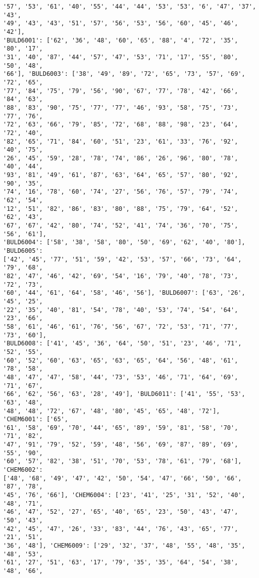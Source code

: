 \documentclass[11pt]{article}
\begin{document}
\begin{Verbatim}[commandchars=\\\{\}]
'57', '53', '61', '40', '55', '44', '44', '53', '53', '6', '47', '37', '43',
'49', '43', '43', '51', '57', '56', '53', '56', '60', '45', '46', '42'],
'BULD6001': ['62', '36', '48', '60', '65', '88', '4', '72', '35', '80', '17',
'31', '40', '87', '44', '57', '47', '53', '71', '17', '55', '80', '50', '48',
'66'], 'BULD6003': ['38', '49', '89', '72', '65', '73', '57', '69', '72', '65',
'77', '84', '75', '79', '56', '90', '67', '77', '78', '42', '66', '84', '63',
'88', '83', '90', '75', '77', '77', '46', '93', '58', '75', '73', '77', '76',
'72', '63', '66', '79', '85', '72', '68', '88', '98', '23', '64', '72', '40',
'82', '65', '71', '84', '60', '51', '23', '61', '33', '76', '92', '40', '75',
'26', '45', '59', '28', '78', '74', '86', '26', '96', '80', '78', '40', '44',
'93', '81', '49', '61', '87', '63', '64', '65', '57', '80', '92', '90', '35',
'74', '16', '78', '60', '74', '27', '56', '76', '57', '79', '74', '62', '54',
'12', '51', '82', '86', '83', '80', '88', '75', '79', '64', '52', '62', '43',
'67', '67', '42', '80', '74', '52', '41', '74', '36', '70', '75', '56', '61'],
'BULD6004': ['58', '38', '58', '80', '50', '69', '62', '40', '80'], 'BULD6005':
['42', '45', '77', '51', '59', '42', '53', '57', '66', '73', '64', '79', '68',
'82', '47', '46', '42', '69', '54', '16', '79', '40', '78', '73', '72', '73',
'60', '44', '61', '64', '58', '46', '56'], 'BULD6007': ['63', '26', '45', '25',
'22', '35', '40', '81', '54', '78', '40', '53', '74', '54', '64', '23', '66',
'58', '61', '46', '61', '76', '56', '67', '72', '53', '71', '77', '73', '60'],
'BULD6008': ['41', '45', '36', '64', '50', '51', '23', '46', '71', '52', '55',
'60', '52', '60', '63', '65', '63', '65', '64', '56', '48', '61', '78', '58',
'48', '47', '47', '58', '44', '73', '53', '46', '71', '64', '69', '71', '67',
'66', '62', '56', '63', '28', '49'], 'BULD6011': ['41', '55', '53', '63', '48',
'48', '48', '72', '67', '48', '80', '45', '65', '48', '72'], 'CHEM6001': ['65',
'61', '58', '69', '70', '44', '65', '89', '59', '81', '58', '70', '71', '82',
'47', '91', '79', '52', '59', '48', '56', '69', '87', '89', '69', '55', '90',
'60', '57', '82', '38', '51', '70', '53', '78', '61', '79', '68'], 'CHEM6002':
['48', '68', '49', '47', '42', '50', '54', '47', '66', '50', '66', '87', '78',
'45', '76', '66'], 'CHEM6004': ['23', '41', '25', '31', '52', '40', '48', '71',
'46', '47', '52', '27', '65', '40', '65', '23', '50', '43', '47', '50', '43',
'42', '45', '47', '26', '33', '83', '44', '76', '43', '65', '77', '21', '51',
'36', '48'], 'CHEM6009': ['29', '32', '37', '48', '55', '48', '35', '48', '53',
'61', '27', '51', '63', '17', '79', '35', '35', '64', '54', '38', '48', '66',

\end{Verbatim}
\end{document}
